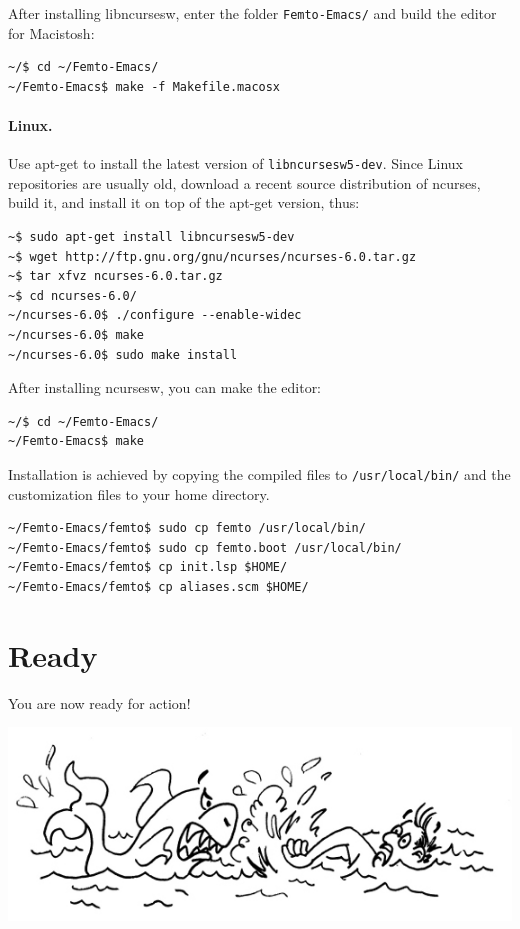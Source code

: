 \documentclass[a4paper,12pt]{book}
\begin{document}
After installing libncursesw, enter the folder \verb|Femto-Emacs/|
and build the editor for Macistosh:
\begin{verbatim}
~/$ cd ~/Femto-Emacs/ 
~/Femto-Emacs$ make -f Makefile.macosx
\end{verbatim}

\paragraph{Linux.} Use apt-get to install the
latest version of \verb|libncursesw5-dev|.
Since Linux repositories are usually old,
 download a recent source distribution of ncurses,
build it, and install it on top of the
apt-get version, thus:
\begin{verbatim}
~$ sudo apt-get install libncursesw5-dev
~$ wget http://ftp.gnu.org/gnu/ncurses/ncurses-6.0.tar.gz
~$ tar xfvz ncurses-6.0.tar.gz
~$ cd ncurses-6.0/
~/ncurses-6.0$ ./configure --enable-widec
~/ncurses-6.0$ make
~/ncurses-6.0$ sudo make install
\end{verbatim}
After installing ncursesw, you can make the editor:
\begin{verbatim}
~/$ cd ~/Femto-Emacs/ 
~/Femto-Emacs$ make
\end{verbatim}

Installation is achieved by copying the
compiled files to \verb|/usr/local/bin/| and
the customization files to your home directory.
\begin{verbatim}
~/Femto-Emacs/femto$ sudo cp femto /usr/local/bin/ 
~/Femto-Emacs/femto$ sudo cp femto.boot /usr/local/bin/ 
~/Femto-Emacs/femto$ cp init.lsp $HOME/ 
~/Femto-Emacs/femto$ cp aliases.scm $HOME/
\end{verbatim}

\section{Ready}
You are now ready for action!

\includegraphics{figs-prefix/readyforaction.jpg}
\end{document}
